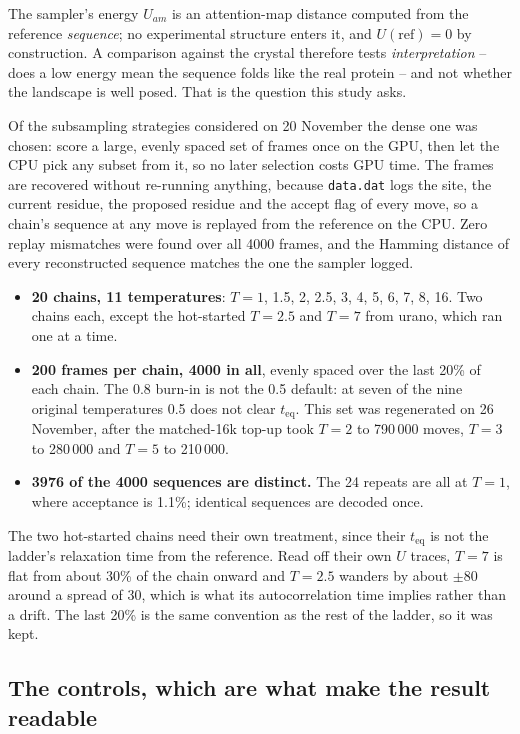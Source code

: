 \documentclass[11pt,a4paper]{article}
\begin{document}
The sampler's energy $U_{am}$ is an attention-map distance computed from the reference
\emph{sequence}; no experimental structure enters it, and $U(\mathrm{ref})=0$ by
construction. A comparison against the crystal therefore tests \emph{interpretation} --
does a low energy mean the sequence folds like the real protein -- and not whether the
landscape is well posed. That is the question this study asks.

Of the subsampling strategies considered on 20 November the dense one was chosen: score a
large, evenly spaced set of frames once on the GPU, then let the CPU pick any subset from
it, so no later selection costs GPU time. The frames are recovered without re-running
anything, because \texttt{data.dat} logs the site, the current residue, the proposed
residue and the accept flag of every move, so a chain's sequence at any move is replayed
from the reference on the CPU. Zero replay mismatches were found over all 4000 frames, and
the Hamming distance of every reconstructed sequence matches the one the sampler logged.

\begin{itemize}
\item \textbf{20 chains, 11 temperatures}: $T=1$, 1.5, 2, 2.5, 3, 4, 5, 6, 7, 8, 16. Two
chains each, except the hot-started $T=2.5$ and $T=7$ from urano, which ran one at a time.
\item \textbf{200 frames per chain, 4000 in all}, evenly spaced over the last 20\% of each
chain. The 0.8 burn-in is not the 0.5 default: at seven of the nine original temperatures
0.5 does not clear $t_{\mathrm{eq}}$. This set was regenerated on 26 November, after the
matched-16k top-up took $T=2$ to 790\,000 moves, $T=3$ to 280\,000 and $T=5$ to 210\,000.
\item \textbf{3976 of the 4000 sequences are distinct.} The 24 repeats are all at $T=1$,
where acceptance is 1.1\%; identical sequences are decoded once.
\end{itemize}

The two hot-started chains need their own treatment, since their $t_{\mathrm{eq}}$ is not
the ladder's relaxation time from the reference. Read off their own $U$ traces, $T=7$ is
flat from about 30\% of the chain onward and $T=2.5$ wanders by about $\pm80$ around a
spread of 30, which is what its autocorrelation time implies rather than a drift. The last
20\% is the same convention as the rest of the ladder, so it was kept.

\subsection{The controls, which are what make the result readable}
\end{document}
